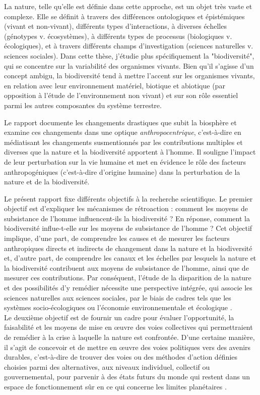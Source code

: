 \begin{displayquote}
\begin{displayquote}
\begin{displayquote}
{La nature, telle qu'elle est définie dans cette approche, est un objet très vaste et complexe. Elle se définit à travers des différences ontologiques et épistémiques (vivant et non-vivant), différents types d'interactions, à diverses échelles (génotypes v. écosystèmes), à différents types de processus (biologiques v. écologiques), et à travers différents champs d'investigation (sciences naturelles v. sciences sociales). Dans cette thèse, j'étudie plus spécifiquement la "biodiversité", qui se concentre sur la variabilité des organismes vivants. Bien qu'il s'agisse d'un concept ambigu, la biodiversité tend à mettre l'accent sur les organismes vivants, en relation avec leur environnement matériel, biotique et abiotique (par opposition à l'étude de l'environnement non vivant) et sur son rôle essentiel parmi les autres composantes du système terrestre.

Le rapport \cite{ipbes_2022_6417333} documente les changements drastiques que subit la biosphère et examine ces changements dans une optique \textit{anthropocentrique}, c'est-à-dire en médiatisant les changements susmentionnés par les contributions multiples et diverses que la nature et la biodiversité apportent à l'homme. Il souligne l'impact de leur perturbation sur la vie humaine et met en évidence le rôle des facteurs anthropogéniques (c'est-à-dire d'origine humaine) dans la perturbation de la nature et de la biodiversité. 
 
Le présent rapport fixe différents objectifs à la recherche scientifique. Le premier objectif est d'expliquer les mécanismes de rétroaction : comment les moyens de subsistance de l'homme influencent-ils la biodiversité ? En réponse, comment la biodiversité influe-t-elle sur les moyens de subsistance de l'homme ? Cet objectif implique, d'une part, de comprendre les causes et de mesurer les facteurs anthropiques directs et indirects de changement dans la nature et la biodiversité et, d'autre part, de comprendre les canaux et les échelles par lesquels la nature et la biodiversité contribuent aux moyens de subsistance de l'homme, ainsi que de mesurer ces contributions. Par conséquent, l'étude de la disparition de la nature et des possibilités d'y remédier nécessite une perspective intégrée, qui associe les sciences naturelles aux sciences sociales, par le biais de cadres tels que les systèmes socio-écologiques \citep{Ostrom2009} ou l'économie environnementale et écologique \citep{daly_ecological_2007}. 
\\
Le deuxième objectif est de fournir un cadre pour évaluer l'opportunité, la faisabilité et les moyens de mise en œuvre des voies collectives qui permettraient de remédier à la crise à laquelle la nature est confrontée. D'une certaine manière, il s'agit de concevoir et de mettre en œuvre des voies politiques vers des avenirs durables, c'est-à-dire de trouver des voies ou des méthodes d'action définies choisies parmi des alternatives, aux niveaux individuel, collectif ou gouvernemental, pour parvenir à des états futurs du monde qui restent dans un espace de fonctionnement sûr en ce qui concerne les limites planétaires \citep{rockstrom2009safe,steffen_2015_planetary}.

}
\end{displayquote}
\end{displayquote}
\end{displayquote}
